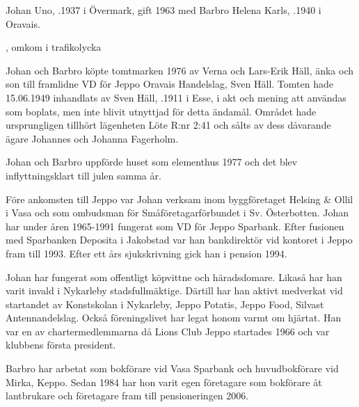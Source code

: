 



Johan Uno, .1937 i Övermark, gift 1963 med Barbro Helena Karls, .1940 i Oravais.
\begin{jhchildren}
  \item {}
  \item {}, omkom i trafikolycka
  \item {}
\end{jhchildren}

Johan och Barbro köpte tomtmarken 1976 av Verna och Lars-Erik Häll, änka och son till framlidne VD för Jeppo Oravais Handelslag, Sven Häll.
Tomten hade 15.06.1949 inhandlats av Sven Häll, .1911 i Esse, i akt och mening att användas som boplats, men inte blivit utnyttjad för detta ändamål. Området hade ursprungligen tillhört lägenheten Löte R:nr 2:41 och sålts av dess dåvarande ägare Johannes och Johanna Fagerholm.

Johan och Barbro uppförde huset som elementhus 1977 och det blev inflyttningsklart till julen samma år.

Före ankomsten till Jeppo var Johan verksam inom byggföretaget Helsing \& Ollil i Vasa och som ombudsman för Småföretagarförbundet i Sv. Österbotten. Johan har under åren 1965-1991 fungerat som VD för Jeppo Sparbank. Efter fusionen med Sparbanken Deposita i Jakobstad var han bankdirektör vid kontoret i Jeppo fram till 1993. Efter ett års sjukskrivning gick han i pension 1994.

Johan har fungerat som offentligt köpvittne och häradsdomare.	Likaså har han varit invald i Nykarleby stadsfullmäktige. Därtill har	han aktivt medverkat vid startandet av Konstskolan i Nykarleby,	Jeppo Potatis, Jeppo Food, Silvast Antennandelslag. Också föreningslivet har legat honom varmt om hjärtat. Han var en av chartermedlemmarna då Lions Club Jeppo startades 1966 och var klubbens första president.

Barbro har arbetat som bokförare vid Vasa Sparbank och huvudbokförare vid Mirka, Keppo. Sedan 1984 har hon varit egen företagare som bokförare åt lantbrukare och företagare fram till pensioneringen 2006.




